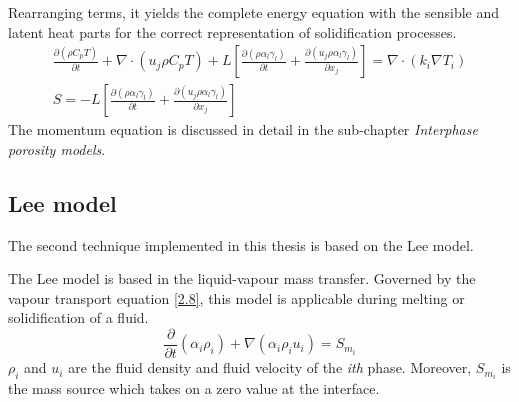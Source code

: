 Rearranging terms, it yields the complete energy equation with the sensible and latent heat parts for the correct representation of solidification processes.
\begin{equation}
	\begin{aligned}
		\frac{\partial (\rho C_{p} T)}{\partial t}+ \nabla \cdot\left(u_{j}\rho C_{p} T\right)+L\left[\frac{\partial (\rho \alpha_{l}\gamma_{l})}{\partial t}+ \frac{\partial (u_{j}\rho \alpha_{l}\gamma_{l})}{\partial x_{j}}\right]=\nabla \cdot\left(k_{i} \nabla T_{i}\right)  \\
		S = -L\left[\frac{\partial (\rho \alpha_{l}\gamma_{l})}{\partial t}+ \frac{\partial (u_{j}\rho \alpha_{l}\gamma_{l})}{\partial x_{j}}\right]
	\end{aligned}
	\label{2.7}
\end{equation}
The momentum equation is discussed in detail in the sub-chapter \textit{Interphase porosity models}.

\subsection{Lee model}

\setlength{\parindent}{0.5cm} The second technique implemented in this thesis is based on the Lee model.

\noindent The Lee model is based in the liquid-vapour mass transfer. Governed by the vapour transport equation \ref{2.8}, this model is applicable during melting or solidification of a fluid.
\begin{equation}
	\frac{\partial}{\partial t}\left(\alpha_{i} \rho_{i}\right)+\nabla\left(\alpha_{i} \rho_{i} {u}_{i}\right)=S_{m _i}
	\label{2.8}
\end{equation}
\textit{$\rho_i$} and \textbf{$u_i$} are the fluid density and fluid velocity of the \textit{i{th}} phase. Moreover, $S_{m_i}$ is the mass source which takes on a zero value at the interface.

